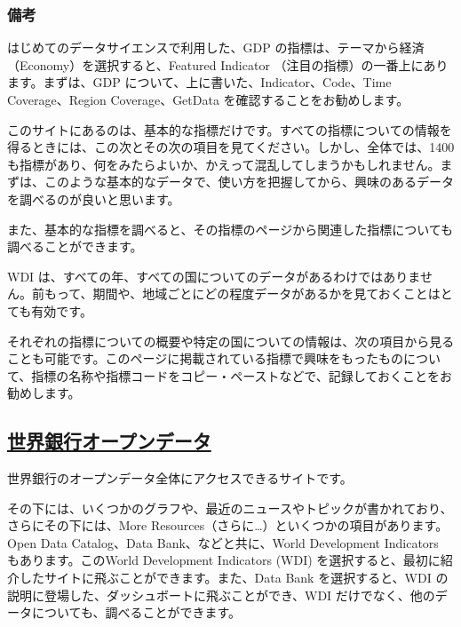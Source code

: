 \documentclass[
  xelatex, ja=standard]{bxjsbook}
\theoremstyle{definition}
\theoremstyle{definition}
\theoremstyle{definition}
\theoremstyle{definition}
\theoremstyle{remark}
\begin{document}
\hypertarget{ux5099ux8003}{%
\subsubsection{備考}\label{ux5099ux8003}}

はじめてのデータサイエンスで利用した、GDP の指標は、テーマから経済（Economy）を選択すると、Featured Indicator （注目の指標）の一番上にあります。まずは、GDP について、上に書いた、Indicator、Code、Time Coverage、Region Coverage、GetData を確認することをお勧めします。

このサイトにあるのは、基本的な指標だけです。すべての指標についての情報を得るときには、この次とその次の項目を見てください。しかし、全体では、1400も指標があり、何をみたらよいか、かえって混乱してしまうかもしれません。まずは、このような基本的なデータで、使い方を把握してから、興味のあるデータを調べるのが良いと思います。

また、基本的な指標を調べると、その指標のページから関連した指標についても調べることができます。

WDI は、すべての年、すべての国についてのデータがあるわけではありません。前もって、期間や、地域ごとにどの程度データがあるかを見ておくことはとても有効です。

それぞれの指標についての概要や特定の国についての情報は、次の項目から見ることも可能です。このページに掲載されている指標で興味をもったものについて、指標の名称や指標コードをコピー・ペーストなどで、記録しておくことをお勧めします。

\hypertarget{ux4e16ux754cux9280ux884cux30aaux30fcux30d7ux30f3ux30c7ux30fcux30bf}{%
\subsection{\texorpdfstring{\href{https://data.worldbank.org}{世界銀行オープンデータ}}{世界銀行オープンデータ}}\label{ux4e16ux754cux9280ux884cux30aaux30fcux30d7ux30f3ux30c7ux30fcux30bf}}

世界銀行のオープンデータ全体にアクセスできるサイトです。

その下には、いくつかのグラフや、最近のニュースやトピックが書かれており、さらにその下には、More Resources（さらに\ldots）といくつかの項目があります。Open Data Catalog、Data Bank、などと共に、World Development Indicators もあります。このWorld Development Indicators (WDI) を選択すると、最初に紹介したサイトに飛ぶことができます。また、Data Bank を選択すると、WDI の説明に登場した、ダッシュボートに飛ぶことができ、WDI だけでなく、他のデータについても、調べることができます。
\end{document}
